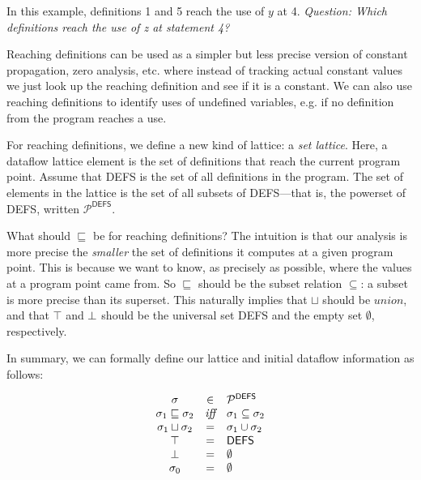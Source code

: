 \documentclass[11pt]{article}
\newcommand{\printanswer}[1]
  {}   %
\newcommand{\answer}[2]
  {\bigskip \printanswer{\noindent
   {\bf Sample Answer #1}. #2 \bigskip}}
\newcommand{\join}{\sqcup}
\newcommand{\alap}{\sqsubseteq}
\begin{document}
\noindent In this example, definitions 1 and 5 reach the use of $y$ at 4.  \emph{Question: Which definitions reach the use of z at statement 4?}


Reaching definitions can be used as a simpler but less precise version of constant propagation, zero analysis, etc. where instead of tracking actual constant values we just look up the reaching definition and see if it is a constant.  We can also use reaching definitions to identify uses of undefined variables, e.g. if no definition from the program reaches a use.

For reaching definitions, we define a new kind of lattice: a \textit{set lattice}.  Here, a dataflow lattice element is the set of definitions that reach the current program point.  Assume that \textsf{DEFS} is the set of all definitions in the program.  The set of elements in the lattice is the set of all subsets of \textsf{DEFS}---that is, the powerset of \textsf{DEFS}, written $\mathcal{P}^{\textsf{DEFS}}$.  

What should $\alap$ be for reaching definitions?  The intuition is that our analysis is more precise the \textit{smaller} the set of definitions it computes at a given program point.  This is because we want to know, as precisely as possible, where the values at a program point came from.  So $\alap$ should be the subset relation $\subseteq$: a subset is more precise than its superset.  This naturally implies that $\join$ should be $union$, and that $\top$ and $\bot$ should be the universal set \textsf{DEFS} and the empty set $\emptyset$, respectively.

In summary, we can formally define our lattice and initial dataflow information as follows:

\[
\begin{array}{ccl}

\sigma & \in & \mathcal{P}^{\textsf{DEFS}}\\
\sigma_1 \alap \sigma_2 & \textit{iff} & \sigma_1 \subseteq \sigma_2\\
\sigma_1 \join \sigma_2 & = & \sigma_1 \union \sigma_2\\
\top & = & \textsf{DEFS}\\
\bottom & = & \emptyset\\
\sigma_0 & = & \emptyset\\

\end{array}
\]
\end{document}
